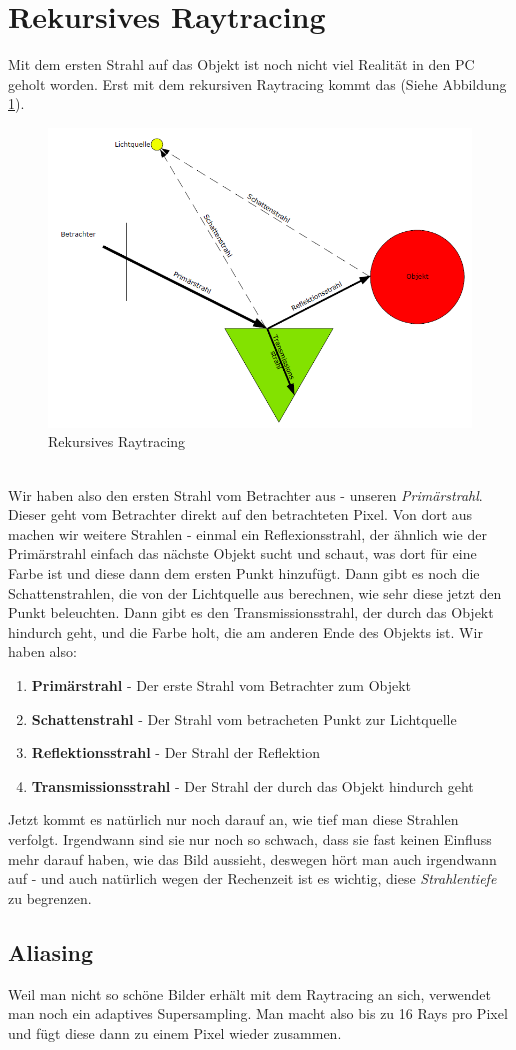 \section{Rekursives Raytracing}
Mit dem ersten Strahl auf das Objekt ist noch nicht viel Realität in den PC geholt worden. Erst mit dem rekursiven Raytracing kommt das (Siehe Abbildung \ref{fig:raytracing_rekursiv}).
\begin{figure}[!ht]
	\centering
	\includegraphics[width=0.8\linewidth]{fig/raytracing_rekursiv}
	\caption{Rekursives Raytracing}
	\label{fig:raytracing_rekursiv}
\end{figure}\\
Wir haben also den ersten Strahl vom Betrachter aus - unseren \textit{Primärstrahl}. Dieser geht vom Betrachter direkt auf den betrachteten Pixel. Von dort aus machen wir weitere Strahlen - einmal ein Reflexionsstrahl, der ähnlich wie der Primärstrahl einfach das nächste Objekt sucht und schaut, was dort für eine Farbe ist und diese dann dem ersten Punkt hinzufügt. Dann gibt es noch die Schattenstrahlen, die von der Lichtquelle aus berechnen, wie sehr diese jetzt den Punkt beleuchten. Dann gibt es den Transmissionsstrahl, der durch das Objekt hindurch geht, und die Farbe holt, die am anderen Ende des Objekts ist. Wir haben also:
\begin{enumerate}
	\item \textbf{Primärstrahl} - Der erste Strahl vom Betrachter zum Objekt
	\item \textbf{Schattenstrahl} - Der Strahl vom betracheten Punkt zur Lichtquelle
	\item \textbf{Reflektionsstrahl} - Der Strahl der Reflektion
	\item \textbf{Transmissionsstrahl} - Der Strahl der durch das Objekt hindurch geht
\end{enumerate}
Jetzt kommt es natürlich nur noch darauf an, wie tief man diese Strahlen verfolgt. Irgendwann sind sie nur noch so schwach, dass sie fast keinen Einfluss mehr darauf haben, wie das Bild aussieht, deswegen hört man auch irgendwann auf - und auch natürlich wegen der Rechenzeit ist es wichtig, diese \textit{Strahlentiefe} zu begrenzen.

\subsection{Aliasing}
Weil man nicht so schöne Bilder erhält mit dem Raytracing an sich, verwendet man noch ein adaptives Supersampling. Man macht also bis zu 16 Rays pro Pixel und fügt diese dann zu einem Pixel wieder zusammen.